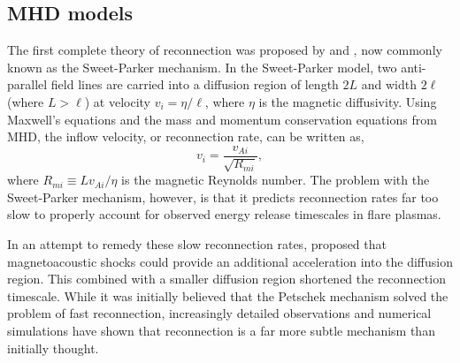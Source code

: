 	\subsection{MHD models}
	The first complete theory of reconnection was proposed by \citet{sweet_neutral_1958} and \citet{parker_sweets_1957,parker_solar-flare_1963}, now commonly known as the Sweet-Parker mechanism. In the Sweet-Parker model, two anti-parallel field lines are carried into a diffusion region of length $2L$ and width $2\ell$ (where $L>\ell$) at velocity $v_i=\eta/\ell$, where $\eta$ is the magnetic diffusivity. Using Maxwell's equations and the mass and momentum conservation equations from MHD, the inflow velocity, or reconnection rate, can be written as,
	\begin{equation}
		v_i = \frac{v_{Ai}}{\sqrt{R_{mi}}},
	\end{equation}
	where $R_{mi}\equiv Lv_{Ai}/\eta$ is the magnetic Reynolds number. The problem with the Sweet-Parker mechanism, however, is that it predicts reconnection rates far too slow to properly account for observed energy release timescales in flare plasmas.

	In an attempt to remedy these slow reconnection rates, \citet{petschek_magnetic_1964} proposed that magnetoacoustic shocks could provide an additional acceleration into the diffusion region. This combined with a smaller diffusion region shortened the reconnection timescale. While it was initially believed that the Petschek mechanism solved the problem of fast reconnection, increasingly detailed observations and numerical simulations have shown that reconnection is a far more subtle mechanism than initially thought.


